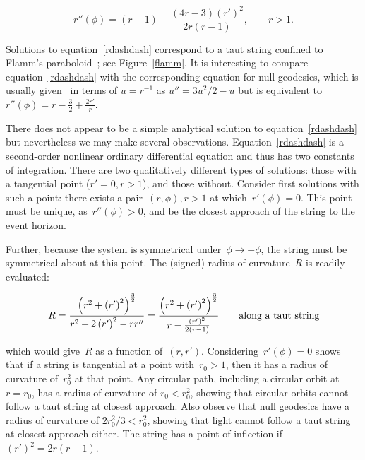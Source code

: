 \documentclass[prb,preprint]{revtex4-1}
\begin{document}
\begin{equation}\label{rdashdash}
  r''\left(\phi\right) =
  (r-1) + \frac{(4r-3)\left(r'\right)^2}{2r\left(r-1\right)},\qquad r>1.
\end{equation}

\noindent 
Solutions to equation~\ref{rdashdash} correspond to a taut string
confined to Flamm's paraboloid~\cite{flamm1916}; see
Figure~\ref{flamm}.  It is interesting to compare
equation~\ref{rdashdash} with the corresponding equation for null
geodesics, which is usually given~\cite{wald} in terms of $u=r^{-1}$
as $u''=3u^2/2-u$ but is equivalent
to~$r''\left(\phi\right)=r-\frac{3}{2}+\frac{2r'}{r}$.

There does not appear to be a simple analytical solution to
equation~\ref{rdashdash} but nevertheless we may make several
observations.  Equation~\ref{rdashdash} is a second-order nonlinear
ordinary differential equation and thus has two constants of
integration.  There are two qualitatively different types of
solutions: those with a tangential point ($r'=0,r>1$), and those
without.  Consider first solutions with such a point: there exists a
pair~$\left(r,\phi\right), r>1$ at which~$r'(\phi)=0$.  This point
must be unique, as~$r''(\phi)>0$, and be the closest approach of the
string to the event horizon.

Further, because the system is symmetrical
under~$\phi\longrightarrow-\phi$, the string must be symmetrical about
at this point.  The (signed) radius of curvature~$R$ is readily
evaluated:

\begin{equation}\label{roc}
  R = \frac{
    \left(r^2 + \left(r'\right)^2\right)^\frac{3}{2}
  }{
    r^2 + 2\left(r'\right)^2-rr''
  }
  =
  \frac{
    \left(r^2 + \left(r'\right)^2\right)^\frac{3}{2}
  }{
    r-\frac{\left(r'\right)^2}{2\left(r-1\right)}
  }\qquad\mbox{along a taut string}
\end{equation}

\noindent which would give~$R$ as a function of~$\left(r,r'\right)$.
Considering~$r'(\phi)=0$ shows that if a string is tangential at a
point with~$r_0>1$, then it has a radius of curvature of~$r_0^2$ at
that point.  Any circular path, including a circular orbit at~$r=r_0$,
has a radius of curvature of $r_0<r_0^2$, showing that circular orbits
cannot follow a taut string at closest approach.  Also observe that
null geodesics have a radius of curvature of $2r_0^2/3 < r_0^2$,
showing that light cannot follow a taut string at closest approach
either.  The string has a point of inflection
if~$\left(r'\right)^2=2r(r-1)$.
\end{document}
